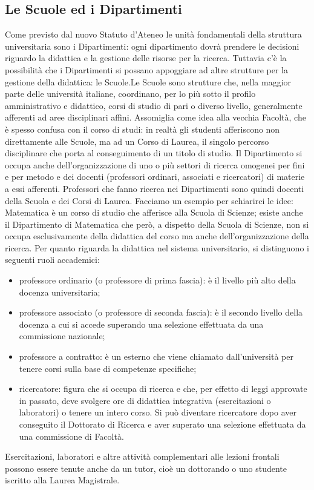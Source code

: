 
\subsection{Le Scuole ed i Dipartimenti}

Come previsto dal nuovo Statuto d'Ateneo le unità fondamentali della struttura universitaria sono i Dipartimenti: ogni dipartimento dovrà prendere le decisioni riguardo la didattica e la gestione delle risorse per la ricerca. Tuttavia c'è la possibilità che i Dipartimenti si possano appoggiare ad altre strutture per la gestione della didattica: le Scuole.Le Scuole sono strutture che, nella maggior parte delle università italiane, coordinano, per lo più sotto il profilo amministrativo e didattico, corsi di studio di pari o diverso livello, generalmente afferenti ad aree disciplinari affini. Assomiglia come idea alla vecchia Facoltà, che è spesso confusa con il corso di studi: in realtà gli studenti afferiscono non direttamente alle Scuole, ma ad un Corso di Laurea, il singolo percorso disciplinare che porta al conseguimento di un titolo di studio.
Il Dipartimento si occupa anche dell'organizzazione di uno o più settori di ricerca omogenei per fini e per metodo e dei docenti (professori ordinari, associati e ricercatori) di materie a essi afferenti. Professori che fanno ricerca nei Dipartimenti sono quindi docenti della Scuola e dei Corsi di Laurea.
Facciamo un esempio per schiarirci le idee: Matematica è un corso di studio che afferisce alla Scuola di Scienze; esiste anche il Dipartimento di Matematica che però, a dispetto della Scuola di Scienze, non si occupa esclusivamente della didattica del corso ma anche dell’organizzazione della ricerca.
Per quanto riguarda la didattica nel sistema universitario, si distinguono i seguenti ruoli accademici:
\begin{itemize}
\item professore ordinario (o professore di prima fascia): è il livello più alto della docenza universitaria;
\item professore associato (o professore di seconda fascia): è il secondo livello della docenza a cui si accede superando una selezione effettuata da una commissione nazionale;
\item professore a contratto: è un esterno che viene chiamato dall’università per tenere corsi sulla base di competenze specifiche;
\item ricercatore: figura che si occupa di ricerca e che, per effetto di leggi approvate in passato, deve svolgere ore di didattica integrativa (esercitazioni o laboratori) o tenere un intero corso. Si può diventare ricercatore dopo aver conseguito il Dottorato di Ricerca e aver superato una selezione effettuata da una commissione di Facoltà.
\end{itemize}
Esercitazioni, laboratori e altre attività complementari alle lezioni frontali possono essere tenute anche da un tutor, cioè un dottorando o uno studente iscritto alla Laurea Magistrale.

